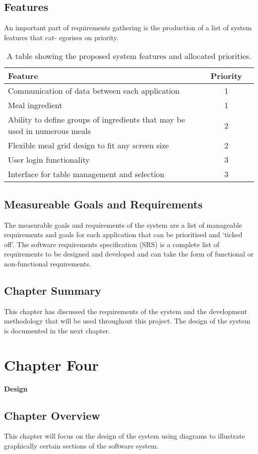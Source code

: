 \documentclass[12pt,a4paper]{article}
\begin{document}
\subsection{Features}
	An important part of requirements gathering is the production of a list of system features that cat-
egorises on priority.

	\begin{table}[H]
	\centering
	\caption{A table showing the proposed system features and allocated priorities.}
	\label{tab:fea}
	\begin{tabular}{l c r}
		\bfseries{Feature} & \bfseries{Priority}\\ \hline
		Communication of data between each application & 1\\
		Meal ingredient & 1\\ \hline
		Ability to define groups of ingredients that may be used in numerous meals & 2\\
		Flexible meal grid design to fit any screen size & 2\\ \hline
		User login functionality & 3\\
		Interface for table management and selection & 3\\
	\end{tabular}
\end{table}	
\subsection{Measureable Goals and Requirements}
	The measurable goals and requirements of the system are a list of manageable requirements and goals
for each application that can be prioritised and ‘ticked off’. The software requirements specification (SRS) is a complete list of requirements to be designed and developed and can take the form of functional
or non-functional requirements.
	
\subsection{Chapter Summary}
	This chapter has discussed the requirements of the system and the development methodology that will
be used throughout this project. The design of the system is documented in the next chapter.
\newpage
\section{Chapter Four}
{\bfseries\Large Design}
	\subsection{Chapter Overview}
	This chapter will focus on the design of the system using diagrams to illustrate graphically certain
sections of the software system.
\end{document}
